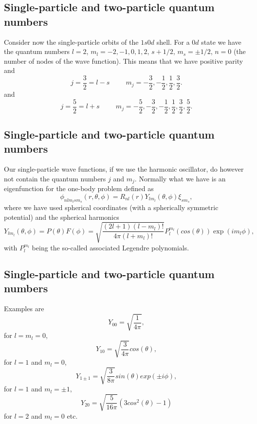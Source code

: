 \documentclass[%
twoside,                 %
final,                   %
10pt]{article}
\begin{document}
\subsection{Single-particle and two-particle quantum numbers}
\begin{block}{}

Consider now the single-particle orbits of the $1s0d$ shell. 
For a $0d$ state we have the quantum numbers $l=2$, $m_l=-2,-1,0,1,2$, $s+1/2$, $m_s=\pm 1/2$,
$n=0$ (the number of nodes of the wave function).   This means that we have positive parity and
\[
j=\frac{3}{2}=l-s\hspace{1cm} m_j=-\frac{3}{2},-\frac{1}{2},\frac{1}{2},\frac{3}{2}.
\]
and
\[
j=\frac{5}{2}=l+s\hspace{1cm} m_j=-\frac{5}{2},-\frac{3}{2},-\frac{1}{2},\frac{1}{2},\frac{3}{2},\frac{5}{2}.
\]
\end{block}


\subsection{Single-particle and two-particle quantum numbers}
\begin{block}{}
Our single-particle wave functions, if we use the harmonic oscillator, do however not contain the quantum numbers $j$ and $m_j$.
Normally what we have is an eigenfunction for the one-body problem defined as
\[
\phi_{nlm_lsm_s}(r,\theta,\phi)=R_{nl}(r)Y_{lm_l}(\theta,\phi)\xi_{sm_s},
\]
where we have used spherical coordinates (with a spherically symmetric potential) and the spherical harmonics
\[
    Y_{lm_l}(\theta,\phi)=P(\theta)F(\phi)=\sqrt{\frac{(2l+1)(l-m_l)!}{4\pi (l+m_l)!}}
                      P_l^{m_l}(cos(\theta))\exp{(im_l\phi)},
\]
with $P_l^{m_l}$ being the so-called associated Legendre polynomials. 
\end{block}



\subsection{Single-particle and two-particle quantum numbers}
\begin{block}{}
Examples are
\[
   Y_{00}=\sqrt{\frac{1}{4\pi}},
\]
for $l=m_l=0$, 
\[
   Y_{10}=\sqrt{\frac{3}{4\pi}}cos(\theta),
\]
for $l=1$ and $m_l=0$, 
\[
   Y_{1\pm 1}=\sqrt{\frac{3}{8\pi}}sin(\theta)exp(\pm i\phi),
\]
for  $l=1$ and $m_l=\pm 1$, 
\[
   Y_{20}=\sqrt{\frac{5}{16\pi}}(3cos^2(\theta)-1)
\]
for $l=2$ and $m_l=0$ etc. 
\end{block}
\end{document}
